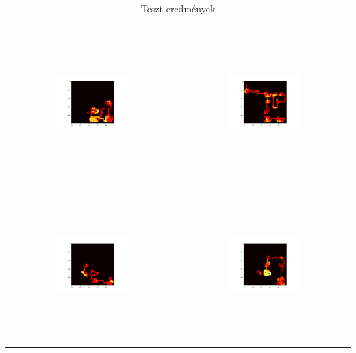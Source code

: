 \begin{table}[h!]
\begin{center}
\begin{tabular}{cc}
            \\
            \includegraphics[width=0.45\textwidth, height=60mm]{images/test1_agent3.png}    
            & 
            \includegraphics[width=0.45\textwidth, height=60mm]{images/test2_agent3.png}
            \\
            \includegraphics[width=0.45\textwidth, height=60mm]{images/test1_agent4.png}    
            & 
            \includegraphics[width=0.45\textwidth, height=60mm]{images/test2_agent4.png}
            \\
        \end{tabular}
        \caption{Teszt eredmények}
        \label{tbl:tests}
    \end{center}
\end{table}

